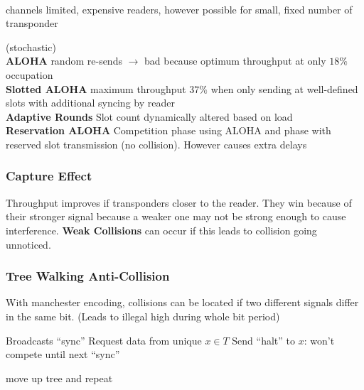 \documentclass{article}
\newlength{\wideitemsep}
\let\olditem\item
\renewcommand{\item}{\setlength{\itemsep}{\wideitemsep}\olditem}
\begin{document}
\begin{multicols}{2}
\begin{description}
\item[FDMA] \ \\
channels limited, expensive readers, however possible for
small, fixed number of transponder
\item[TDMA] (stochastic) \ \\
{\bf ALOHA} random re-sends $\rightarrow$ bad because optimum
throughput at only $18 \%$ occupation \\
{\bf Slotted ALOHA} maximum throughput $37 \%$ when
only sending at well-defined slots with additional syncing by reader \\
{\bf Adaptive Rounds} Slot count dynamically altered based on load \\
{\bf Reservation ALOHA} Competition phase using ALOHA and phase with reserved
slot transmission (no collision). However causes extra delays
\end{description}

\subsubsection{Capture Effect}
Throughput improves if transponders closer to the reader. They win because of
their stronger signal because a weaker one may not be strong enough to cause
interference. {\bf Weak Collisions} can occur if this leads to collision going
unnoticed.

\subsubsection{Tree Walking Anti-Collision}
With manchester encoding, collisions can be located if two different signals
differ in the same bit. (Leads to illegal high during whole bit period)

\begin{algorithm}[H]
    \SetAlgoLined
    
    Broadcasts ``sync''\;
    Request data from unique $x \in T$\;
    Send ``halt'' to $x$: won't compete until next ``sync''\;
    
    move up tree and repeat\;


\end{algorithm}
\end{multicols}
\end{document}
